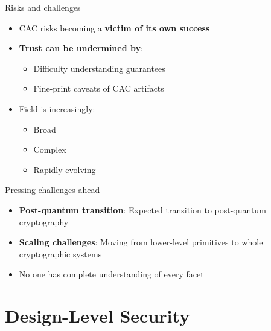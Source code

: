 \documentclass[aspectratio=169, lualatex, handout]{beamer}
\begin{document}
\begin{frame}{Risks and challenges}
	\begin{itemize}
		\item CAC risks becoming a \textbf{victim of its own success}
		\item \textbf{Trust can be undermined by}:
		      \begin{itemize}
			      \item Difficulty understanding guarantees
			      \item Fine-print caveats of CAC artifacts
		      \end{itemize}
		\item Field is increasingly:
		      \begin{itemize}
			      \item Broad
			      \item Complex
			      \item Rapidly evolving
		      \end{itemize}
	\end{itemize}
\end{frame}

\begin{frame}{Pressing challenges ahead}
	\begin{itemize}
		\item \textbf{Post-quantum transition}: Expected transition to post-quantum cryptography
		\item \textbf{Scaling challenges}: Moving from lower-level primitives to whole cryptographic systems
		\item No one has complete understanding of every facet
	\end{itemize}
\end{frame}

\section{Design-Level Security}
\end{document}
